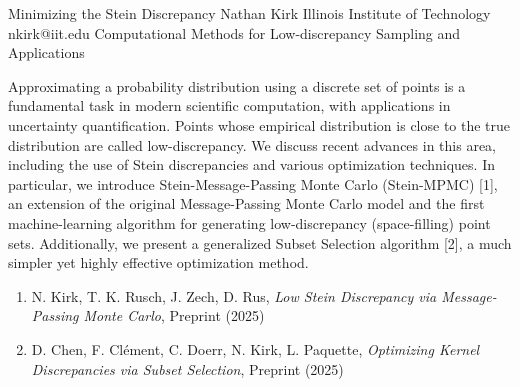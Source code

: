 \begin{talk}
  {Minimizing the Stein Discrepancy}%
  {Nathan Kirk}%
  {Illinois Institute of Technology}%
  {nkirk@iit.edu}%
  {}%
  {Computational Methods for Low-discrepancy Sampling and Applications}%
    
   
Approximating a probability distribution using a discrete set of points is a fundamental task in modern scientific computation, with applications in uncertainty quantification. Points whose empirical distribution is close to the true distribution are called low-discrepancy. We discuss recent advances in this area, including the use of Stein discrepancies and various optimization techniques. In particular, we introduce Stein-Message-Passing Monte Carlo (Stein-MPMC) [1], an extension of the original Message-Passing Monte Carlo model and the first machine-learning algorithm for generating low-discrepancy (space-filling) point sets. Additionally, we present a generalized Subset Selection algorithm [2], a much simpler yet highly effective optimization method.

\medskip

\begin{enumerate}
 \item[{[1]}] N. Kirk, T. K. Rusch, J. Zech, D. Rus, \textit{Low Stein Discrepancy via Message-Passing Monte Carlo}, Preprint (2025)
 \item[{[2]}] D. Chen, F. Cl\'ement, C. Doerr, N. Kirk, L. Paquette, \textit{Optimizing Kernel Discrepancies via Subset Selection}, Preprint (2025)
\end{enumerate}


\end{talk}

